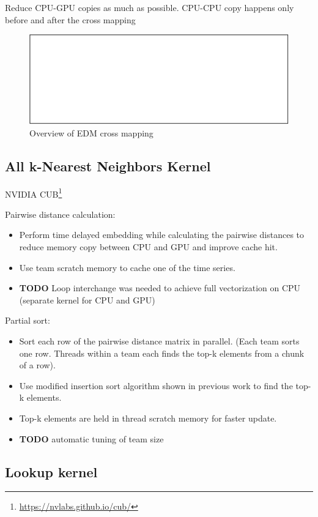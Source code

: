 \documentclass[conference]{IEEEtran}
\begin{document}
Reduce CPU-GPU copies as much as possible. CPU-CPU copy happens only before
and after the cross mapping

\begin{figure}
    \centering
    \includegraphics{figs/xmap_overview}
    \caption{Overview of EDM cross mapping}%
    \label{fig:architecture}
\end{figure}

\subsection{All k-Nearest Neighbors Kernel}

NVIDIA CUB\footnote{\url{https://nvlabs.github.io/cub/}}

Pairwise distance calculation:
\begin{itemize}
\item Perform time delayed embedding while calculating the pairwise distances
    to reduce memory copy between CPU and GPU and improve cache hit.
\item Use team scratch memory to cache one of the time series.
\item \textbf{TODO} Loop interchange was needed to achieve full vectorization
    on CPU (separate kernel for CPU and GPU)
\end{itemize}

Partial sort:
\begin{itemize}
\item Sort each row of the pairwise distance matrix in parallel. (Each team sorts one row. Threads within a team each finds the top-k elements from a chunk of a row).
\item Use modified insertion sort algorithm shown in previous work to find the top-k elements.
\item Top-k elements are held in thread scratch memory for faster update.
\item \textbf{TODO} automatic tuning of team size
\end{itemize}

\subsection{Lookup kernel}
\end{document}
